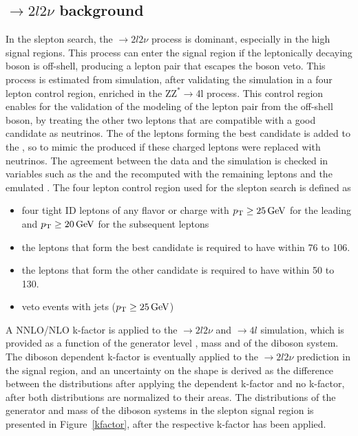 \subsection*{\PZZ$\rightarrow2l2\nu$ background}
\noindent\justify
In the slepton search, the \PZZ$\rightarrow2l2\nu$ process is dominant, especially in the high \ptmiss signal regions.
This process can enter the signal region if the leptonically decaying \PZ boson is off-shell, producing a lepton pair that escapes the \PZ boson veto.
This process is estimated from simulation, after validating the simulation in a four lepton control region, enriched in the Z$\mathrm{Z^{*}}\rightarrow$4l process.
This control region enables for the validation of the modeling of the lepton pair from the off-shell \PZ boson, by treating the other two leptons that are compatible with a good \PZ candidate as neutrinos. 
The \pt of the leptons forming the best \PZ candidate is added to the \ptmiss, so to mimic the \ptmiss produced if these charged leptons were replaced with neutrinos.
The agreement between the data and the simulation is checked in variables such as the \ptmiss and the \mttwo recomputed with the remaining leptons and the emulated \ptmiss.
The four lepton control region used for the slepton search is defined as
\begin{itemize} 
    \item four tight ID leptons of any flavor or charge with $p_{\mathrm{T}}\geq25\,\text{Ge\hspace{-.08em}V}$ for the leading and $p_{\mathrm{T}}\geq20\,\text{Ge\hspace{-.08em}V}$ for the subsequent leptons
    \item the leptons that form the best \PZ candidate is required to have \mll within 76 to 106\GeV. 
    \item the leptons that form the other \PZ candidate is required to have \mll within 50 to 130\GeV.
    \item veto events with jets ($p_{\mathrm{T}}\geq25\,\text{Ge\hspace{-.08em}V}$) 
\end{itemize}    
\newpara                   
\noindent\justify
A NNLO/NLO k-factor is applied to the \PZZ$\rightarrow 2l2\nu$ and \PZZ$\rightarrow 4l$ simulation, which is provided as a function of the generator level \pt, mass and \dphi of the diboson system.
The diboson \pt dependent k-factor is eventually applied to the \PZZ$\rightarrow 2l2\nu$  prediction in the signal region, and an uncertainty on the shape is derived as the difference between the distributions after applying the \pt dependent k-factor and no k-factor, after both distributions are normalized to their areas.
The distributions of the generator \pt and mass of the diboson systems in the slepton signal region is presented in Figure~\ref{kfactor}, after the respective k-factor has been applied.
